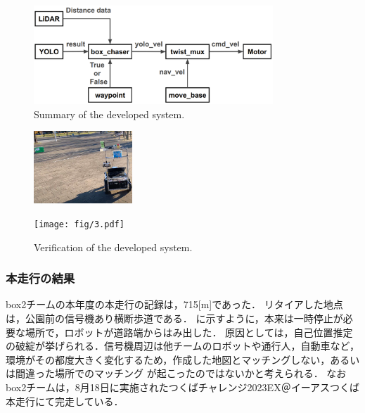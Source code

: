 \documentclass[twocolumn, 9pt]{jsproceedings}
\begin{document}
\begin{figure}[h!]
  \centering
  \includegraphics[width=90mm]{fig/act.pdf}
  \caption{Summary of the developed system.}
  \label{fig:hako_act}
\end{figure}

\vspace*{-1zh}

\begin{figure}[h]
  \centering
  \begin{minipage}[b]{0.45\linewidth}
    \centering
    \includegraphics[width=37mm]{fig/1.pdf}
    \caption*{(a) Found the box}
  \end{minipage} 
  \hspace*{2mm}
  \begin{minipage}[b]{0.45\linewidth}
    \centering
    \texttt{[image: fig/3.pdf]}
    \caption*{\hspace*{-1mm}(b) Stop near the box}
  \end{minipage}
  \caption{Verification of the developed system.}
  \label{fig:action}
\end{figure}







\subsubsection{本走行の結果}
box2チームの本年度の本走行の記録は，715[m]であった．
リタイアした地点は，公園前の信号機あり横断歩道である．
に示すように，本来は一時停止が必要な場所で，ロボットが道路端からはみ出した．
原因としては，自己位置推定の破綻が挙げられる．信号機周辺は他チームのロボットや通行人，自動車など，
環境がその都度大きく変化するため，作成した地図とマッチングしない，あるいは間違った場所でのマッチング
が起こったのではないかと考えられる．
なお box2チームは，8月18日に実施されたつくばチャレンジ2023EX＠イーアスつくば本走行にて完走している．
\end{document}
